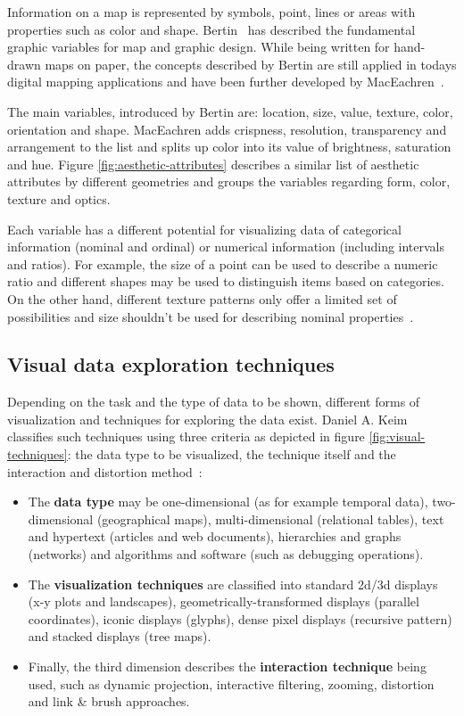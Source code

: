 Information on a map is represented by symbols, point, lines or areas with properties such as color and shape. Bertin~\cite{bertin67graphics, bertin83graphics} has described the fundamental graphic variables for map and graphic design. While being written for hand-drawn maps on paper, the concepts described by Bertin are still applied in todays digital mapping applications and have been further developed by MacEachren~\cite{MacEachren95maps}.

The main variables, introduced by Bertin are: location, size, value, texture, color, orientation and shape. MacEachren adds crispness, resolution, transparency and arrangement to the list and splits up color into its value of brightness, saturation and hue. Figure \ref{fig:aesthetic-attributes} describes a similar list of aesthetic attributes by different geometries and groups the variables regarding form, color, texture and optics.

Each variable has a different potential for visualizing data of categorical information (nominal and ordinal) or numerical information (including intervals and ratios). For example, the size of a point can be used to describe a numeric ratio and different shapes may be used to distinguish items based on categories. On the other hand, different texture patterns only offer a limited set of possibilities and size shouldn't be used for describing nominal properties~\cite{noellenburg11geovis, MacEachren95maps}. 

\subsection{Visual data exploration techniques}

Depending on the task and the type of data to be shown, different forms of visualization and techniques for exploring the data exist. Daniel A. Keim~\cite{keim2001vis} classifies such techniques using three criteria as depicted in figure \ref{fig:visual-techniques}: the data type to be visualized, the technique itself and the interaction and distortion method~\cite{Delort10vis}:

\begin{itemize}

\item The \textbf{data type} may be one-dimensional (as for example temporal data), two-dimensional (geographical maps), multi-dimensional (relational tables), text and hypertext (articles and web documents), hierarchies and graphs (networks) and algorithms and software (such as debugging operations).

\item The \textbf{visualization techniques} are classified into standard 2d/3d displays (x-y plots and landscapes), geometrically-transformed displays (parallel coordinates), iconic displays (glyphs), dense pixel displays (recursive pattern) and stacked displays (tree maps).

\item Finally, the third dimension describes the \textbf{interaction technique} being used, such as dynamic projection, interactive filtering, zooming, distortion and link \& brush approaches.

\end{itemize}

